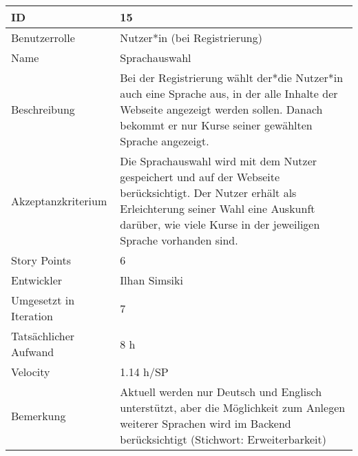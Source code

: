 \begin{tabularx}{\textwidth}{|p{}|X|}
	\hline
	ID & 15\\
	\hline
	Benutzerrolle & Nutzer*in (bei Registrierung)\\
	\hline
	Name & Sprachauswahl\\
	\hline
	Beschreibung & Bei der Registrierung wählt der*die Nutzer*in auch eine Sprache aus, in der alle Inhalte der Webseite angezeigt werden sollen. Danach bekommt er nur Kurse seiner gewählten Sprache angezeigt.\\
	\hline
	Akzeptanzkriterium & Die Sprachauswahl wird mit dem Nutzer gespeichert und auf der Webseite berücksichtigt. Der Nutzer erhält als Erleichterung seiner Wahl eine Auskunft darüber, wie viele Kurse in der jeweiligen Sprache vorhanden sind.\\
	\hline
	Story Points & 6\\
	\hline
	Entwickler & Ilhan Simsiki\\
	\hline
	Umgesetzt in Iteration & 7\\ 
	\hline
	Tatsächlicher Aufwand & 8 h\\
	\hline
	Velocity & 1.14 h/SP\\
	\hline
	Bemerkung & Aktuell werden nur Deutsch und Englisch unterstützt, aber die Möglichkeit zum Anlegen weiterer Sprachen wird im Backend berücksichtigt (Stichwort: Erweiterbarkeit)\\
	\hline
\end{tabularx}
\vspace{20pt}
